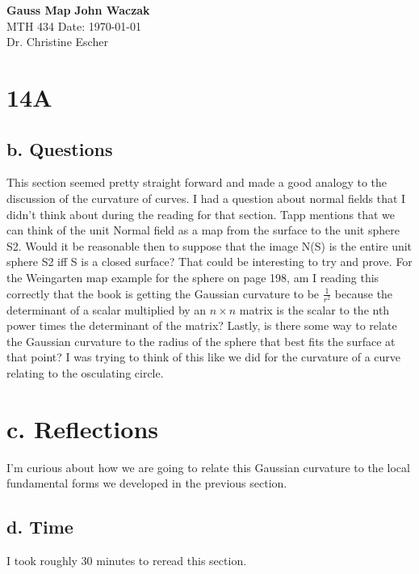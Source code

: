 \documentclass[a4paper, 11pt]{article}
\begin{document}
\noindent
\large\textbf{Gauss Map} \hfill \textbf{John Waczak} \\
\normalsize MTH 434 \hfill  Date: \today \\
Dr. Christine Escher \\

\section*{14A}
	\subsection*{b. Questions}
	This section seemed pretty straight forward and made a good analogy to the discussion of the curvature of curves. I had a question about normal fields that I didn't think about during the reading for that section. Tapp mentions that we can think of the unit Normal field as a map from the surface to the unit sphere S2. Would it be reasonable then to suppose that the image N(S) is the entire unit sphere S2 iff S is a closed surface? That could be interesting to try and prove. For the Weingarten map example for the sphere on page 198, am I reading this correctly that the book is getting the Gaussian curvature to be $\frac{1}{r^2}$ because the determinant of a scalar multiplied by an $n\times n$ matrix is the scalar to the nth power times the determinant of the matrix? Lastly, is there some way to relate the Gaussian curvature to the radius of the sphere that best fits the surface at that point? I was trying to think of this like we did for the curvature of a curve relating to the osculating circle.  
	
	\section*{c. Reflections}
	I'm curious about how we are going to relate this Gaussian curvature to the local fundamental forms we developed in the previous section. 
	
	\subsection*{d. Time}
	I took roughly 30 minutes to reread this section. 
\end{document}
